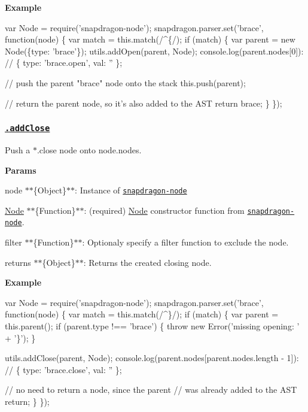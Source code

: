{\bfseries Example}


\begin{DoxyCode}
var Node = require('snapdragon-node');
snapdragon.parser.set('brace', function(node) \{
  var match = this.match(/^\{/);
  if (match) \{
    var parent = new Node(\{type: 'brace'\});
    utils.addOpen(parent, Node);
    console.log(parent.nodes[0]):
    // \{ type: 'brace.open', val: '' \};

    // push the parent "brace" node onto the stack
    this.push(parent);

    // return the parent node, so it's also added to the AST
    return brace;
  \}
\});
\end{DoxyCode}


\subsubsection*{\href{index.js#L244}{\tt .add\+Close}}

Push a {\ttfamily $\ast$.close} node onto {\ttfamily node.\+nodes}.

{\bfseries Params}


\begin{DoxyItemize}
\item {\ttfamily node} $\ast$$\ast$\{Object\}$\ast$$\ast$\+: Instance of \href{https://github.com/jonschlinkert/snapdragon-node}{\tt snapdragon-\/node}
\item {\ttfamily \mbox{\hyperlink{classNode}{Node}}} $\ast$$\ast$\{Function\}$\ast$$\ast$\+: (required) \mbox{\hyperlink{classNode}{Node}} constructor function from \href{https://github.com/jonschlinkert/snapdragon-node}{\tt snapdragon-\/node}.
\item {\ttfamily filter} $\ast$$\ast$\{Function\}$\ast$$\ast$\+: Optionaly specify a filter function to exclude the node.
\item {\ttfamily returns} $\ast$$\ast$\{Object\}$\ast$$\ast$\+: Returns the created closing node.
\end{DoxyItemize}

{\bfseries Example}


\begin{DoxyCode}
var Node = require('snapdragon-node');
snapdragon.parser.set('brace', function(node) \{
  var match = this.match(/^\}/);
  if (match) \{
    var parent = this.parent();
    if (parent.type !== 'brace') \{
      throw new Error('missing opening: ' + '\}');
    \}

    utils.addClose(parent, Node);
    console.log(parent.nodes[parent.nodes.length - 1]):
    // \{ type: 'brace.close', val: '' \};

    // no need to return a node, since the parent
    // was already added to the AST
    return;
  \}
\});
\end{DoxyCode}


